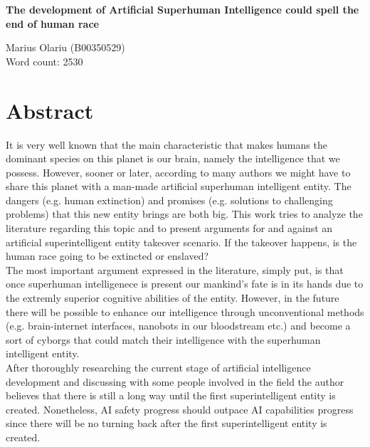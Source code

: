 \documentclass[11pt]{article}
\begin{document}
	
	\begin{titlepage}
    \centering
    \vspace*{\fill}

    \vspace*{0.5cm}

    \huge\bfseries
		The development of Artificial Superhuman Intelligence could spell the end of human race
    \vspace*{0.5cm}

	\large Marius Olariu (B00350529)\\ Word count: 2530

    \vspace*{\fill}
    \end{titlepage}

\section*{Abstract}
	It is very well known that the main characteristic that makes humans the dominant species on this planet is our brain, namely the intelligence that we possess. However, sooner or later, according to many authors we might have to share this planet with a man-made artificial superhuman intelligent entity. The dangers (e.g. human extinction) and promises (e.g. solutions to challenging problems) that this new entity brings are both big. This work tries to analyze the literature regarding this topic and to present arguments for and against an artificial superintelligent entity takeover scenario. If the takeover happens, is the human race going to be extincted or enslaved?\\
	\indent
	The most important argument expressed in the literature, simply put, is that once superhuman intelligenece is present our mankind's fate is in its hands due to the extremly superior cognitive abilities of the entity. However, in the future there will be possible to enhance our intelligence through unconventional methods (e.g. brain-internet interfaces, nanobots in our bloodstream etc.) and become a sort of cyborgs that could match their intelligence with the superhuman intelligent entity. 	   \\
	\indent
	After thoroughly researching the current stage of artificial intelligence development and discussing with some people involved in the field the author believes that there is still a long way until the first superintelligent entity is created. Nonetheless, AI safety progress should outpace AI capabilities progress since there will be no turning back after the first superintelligent entity is created.\\
 
\end{document}
